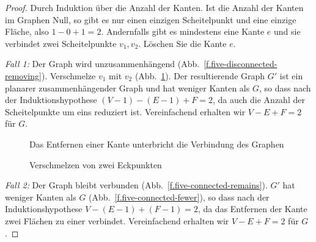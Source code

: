 \begin{proof}
Durch Induktion über die Anzahl der Kanten. Ist die Anzahl der Kanten im Graphen Null, so gibt es nur einen einzigen Scheitelpunkt und eine einzige Fläche, also $1-0+1=2$. Andernfalls gibt es mindestens eine Kante $e$ und sie verbindet zwei Scheitelpunkte $v_1,v_2$. Löschen Sie die Kante $e$.

\textit{Fall 1:}
Der Graph wird unzusammenhängend (Abb.~\ref{f.five-disconnected-removing}). Verschmelze $v_1$ mit $v_2$ (Abb.~\ref{f.five-disconnected-merge}). Der resultierende Graph $G'$ ist ein planarer zusammenhängender Graph und hat weniger Kanten als $G$, so dass nach der Induktionshypothese $(V-1)-(E-1)+F=2$, da auch die Anzahl der Scheitelpunkte um eins reduziert ist. Vereinfachend erhalten wir $V-E+F=2$ für $G$.
\begin{figure}[ht]
\begin{minipage}{.45\textwidth}
\caption{Das Entfernen einer Kante unterbricht die Verbindung des Graphen}\label{f.five-disconnected-removing}
\end{minipage}
\hfill
\begin{minipage}{.45\textwidth}
\caption{Verschmelzen von zwei Eckpunkten}\label{f.five-disconnected-merge}
\end{minipage}
\end{figure}

\textit{Fall 2:}
Der Graph bleibt verbunden (Abb.~\ref{f.five-connected-remains}). $G'$ hat weniger Kanten als $G$ (Abb.~\ref{f.five-connected-fewer}), so dass nach der Induktionshypothese $V-(E-1)+(F-1)=2$, da das Entfernen der Kante zwei Flächen zu einer verbindet. Vereinfachend erhalten wir $V-E+F=2$ für $G$.
\end{proof}

